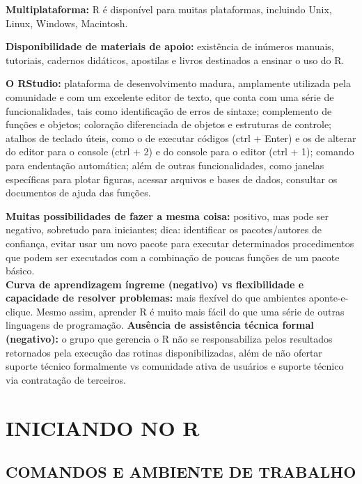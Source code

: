 \documentclass[
  11pt,
  a5paper,
  openany]{book}
\begin{document}
\textbf{Multiplataforma:} R é disponível para muitas plataformas, incluindo Unix, Linux, Windows, Macintosh.

\textbf{Disponibilidade de materiais de apoio:} existência de inúmeros manuais, tutoriais, cadernos didáticos, apostilas e livros destinados a ensinar o uso do R.

\textbf{O RStudio:} plataforma de desenvolvimento madura, amplamente utilizada pela comunidade e com um excelente editor de texto, que conta com uma série de funcionalidades, tais como identificação de erros de sintaxe; complemento de funções e objetos; coloração diferenciada de objetos e estruturas de controle; atalhos de teclado úteis, como o de executar códigos (ctrl + Enter) e os de alterar do editor para o console (ctrl + 2) e do console para o editor (ctrl + 1); comando para endentação automática; além de outras funcionalidades, como janelas específicas para plotar figuras, acessar arquivos e bases de dados, consultar os documentos de ajuda das funções.

\textbf{Muitas possibilidades de fazer a mesma coisa:} positivo, mas pode ser negativo, sobretudo para iniciantes; dica: identificar os pacotes/autores de confiança, evitar usar um novo pacote para executar determinados procedimentos que podem ser executados com a combinação de poucas funções de um pacote básico.\\
\textbf{Curva de aprendizagem íngreme (negativo) vs flexibilidade e capacidade de resolver problemas:} mais flexível do que ambientes aponte-e-clique. Mesmo assim, aprender R é muito mais fácil do que uma série de outras linguagens de programação.
\textbf{Ausência de assistência técnica formal (negativo):} o grupo que gerencia o R não se responsabiliza pelos resultados retornados pela execução das rotinas disponibilizadas, além de não ofertar suporte técnico formalmente vs comunidade ativa de usuários e suporte técnico via contratação de terceiros.

\hypertarget{iniciando-no-r}{%
\chapter{INICIANDO NO R}\label{iniciando-no-r}}

\hypertarget{comandos-e-ambiente-de-trabalho}{%
\section{COMANDOS E AMBIENTE DE TRABALHO}\label{comandos-e-ambiente-de-trabalho}}
\end{document}
